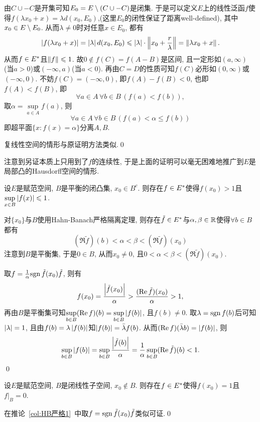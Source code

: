 	由$ C\cup -C $是开集可知$ E_0=E\setminus(C\cup-C) $是闭集. 于是可以定义$ E $上的线性泛函$ f $使得$ f(\lambda x_0+x)=\lambda d(x_0,E_0) $,(这里$ E_0 $的闭性保证了距离well-defined), 其中$ x_0\in E\setminus E_0 $. 从而$ \lambda\ne 0 $时对任意$ x\in E_0 $, 都有
	\[
	\left| f(\lambda x_0+x) \right| =\left| \lambda \right| d(x_0,E_0)\leqslant\left| \lambda \right| \cdot\left\| x_0+\frac{r}{\lambda} \right\|=\left\| \lambda x_0+x \right\|.
	\]
	从而$ f\in E^{*} $且$ \left\| f \right\|\leqslant 1 $. 故$ 0\notin f(C)=f(A-B) $是区间, 且一定形如$ (a,\infty) $(当$ a>0 $)或$ (-\infty,a) $(当$ a<0 $). 再由$ C=D $的性质可知$ f(C) $必形如$ (0,\infty) $或$ (-\infty,0) $. 不妨$ f(C)=(-\infty,0) $, 即$ f(A)-f(B)<0 $, 也即$ f(A)<f(B) $, 即
	\[
	\forall a\in A\,\forall b\in B\,(f(a)<f(b)),
	\]
	取$ \alpha=\sup\limits_{a\in A}f(a) $, 则
	\[
	\forall a\in A\,\forall b\in B\,(f(a)<\alpha\leqslant f(b))
	\]
	即超平面$ \{ x : f(x)=\alpha \} $分离$ A, B $.
	
	复线性空间的情形与原证明方法类似.\qed
	
	注意到另证本质上只用到了$ f $的连续性, 于是上面的证明可以毫无困难地推广到$ E $是局部凸的Hausdorff空间的情形.
	
	\begin{Corollary}\label{col:HB严格1}
	设$ E $是赋范空间, $ B $是平衡的闭凸集, $ x_0\in B^c $. 则存在$ f\in E^{*} $使得$ f(x_0)>1 $且$ \sup\limits_{x\in B}\left| f(x) \right| \leqslant 1 $.
	\end{Corollary}
	\begin{Proof}
	对$ \{ x_0 \} $与$ B $使用Hahn-Banach严格隔离定理, 则存在$ \tilde{f}\in E^{*} $与$ \alpha,\beta\in\mathbb{R} $使得$ \forall b\in B $都有
	\[
	(\Re\tilde{f})(b)<\alpha<\beta<(\Re\tilde{f})(x_0)
	\]
	注意到$ B $是平衡集, 于是$ 0\in B $, 从而$ x_0\ne 0 $, 且$ 0<\alpha<\beta<(\Re\tilde{f})(x_0) $.
	
	取$ f=\frac{1}{\alpha}\mathrm{sgn}\,\tilde{f}(x_0)\tilde{f} $, 则有
	\[
	f(x_0)=\frac{\Big| \tilde f(x_0) \Big| }{\alpha}>\frac{(\mathrm{Re\,} \tilde{f})(x_0)}{\alpha}>1,
	\]
	再由$ B $是平衡集可知$ \sup\limits_{b\in B}(\mathrm{Re\,} f)(b)=\sup\limits_{b\in B}\left| f(b) \right|  $, 且$ f(b)\ne 0 $. 取$ \lambda=\mathrm{sgn}\, f(b) $后可知$ \left| \lambda \right| =1 $, 且由$ f(b)=\lambda\left| f(b) \right|  $知$ \left| f(b) \right| =\bar{\lambda}f(b) $. 从而$ (\mathrm{Re\,} f)(\bar{\lambda}b)=\left| f(b) \right|  $, 则
	\[
	\sup_{b\in B}\left| f(b) \right| =\sup_{b\in B}\frac{\Big| \tilde{f}(b) \Big| }{\alpha}=\frac{1}{\alpha}\sup_{b\in B}(\mathrm{Re\,}\tilde{f})(b)<1.
	\]
	\qed
	\end{Proof}
	
	\begin{Corollary}
	设$ E $是赋范空间, $ B $是闭线性子空间, $ x_0\notin B $. 则存在$ f\in E^{*} $使得$ f(x_0)=1 $且$ f\rvert_B=0 $.
	\end{Corollary}
	\begin{Proof}
	在推论~\ref{col:HB严格1}~中取$ f=\mathrm{sgn}\,\tilde{f}(x_0)\tilde{f} $类似可证.\qed
	\end{Proof}
	
